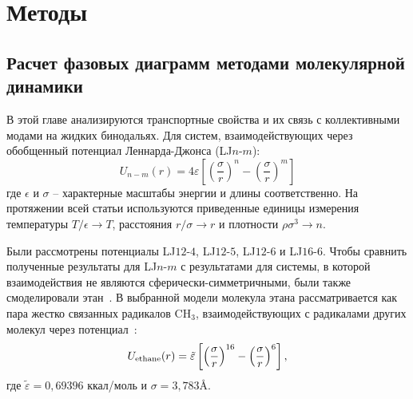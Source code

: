 \section{Методы}
\label{MACR-SecMethods}

\subsection{Расчет фазовых диаграмм методами молекулярной динамики}
\label{MACR-SubSecMD}

В этой главе анализируются транспортные свойства и их связь с коллективными модами на жидких бинодальях.
Для систем, взаимодействующих через обобщенный потенциал Леннарда-Джонса (LJ$n$-$m$):
\begin{equation}
U_{n-m}(r)=4 \varepsilon\left[\left(\frac{\sigma}{r}\right)^{n}-\left(\frac{\sigma}{r}\right)^{m}\right]
\label{MACR-eq1}
\end{equation}
где $\epsilon$ и $\sigma$ -- характерные масштабы энергии и длины соответственно.
На протяжении всей статьи используются приведенные единицы измерения температуры $ T/ \epsilon \rightarrow T $, расстояния $ r/ \sigma \rightarrow r $ и плотности $ \rho \sigma ^ 3 \rightarrow n$.


Были рассмотрены потенциалы LJ$12$-$4$, LJ$12$-$5$, LJ$12$-$6$ и LJ$16$-$6$.
Чтобы сравнить полученные результаты для LJ$n$-$m$ с результатами для системы, в которой взаимодействия не являются сферически-симметричными, были также смоделировали этан~\cite{10.1021/acs.jced.6b01036}.
В выбранной модели молекула этана рассматривается как пара жестко связанных радикалов CH$_3$, взаимодействующих с радикалами других молекул через потенциал~\cite{10.1021/acs.jced.6b01036}:
\begin{equation}
U_{\rm {ethane}}(r) = \tilde \varepsilon\left[\left(\frac{\sigma}{r}\right)^{16}-\left(\frac{\sigma}{r}\right)^{6}\right],
\label{MACR-eq2}
\end{equation}
где $\tilde\varepsilon = 0,69396$ ккал/моль и $\sigma = 3,783$\AA.


